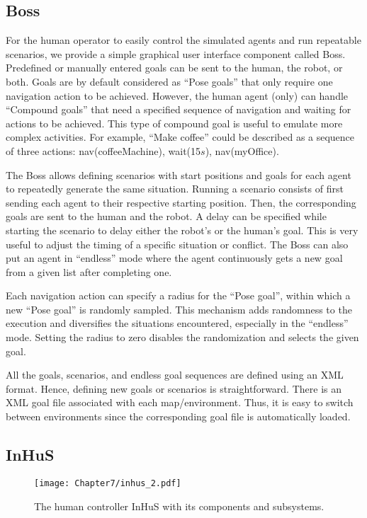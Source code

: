 \subsection{Boss}
For the human operator to easily control the simulated agents and run repeatable scenarios, we provide a simple graphical user interface component called Boss. Predefined or manually entered goals can be sent to the human, the robot, or both. Goals are by default considered as ``Pose goals'' that only require one navigation action to be achieved. However, the human agent (only) can handle ``Compound goals'' that need a specified sequence of navigation and waiting for actions to be achieved. This type of compound goal is useful to emulate more complex activities. For example, ``Make coffee'' could be described as a sequence of three actions: nav(coffeeMachine), wait(15$s$), nav(myOffice).

The Boss allows defining scenarios with start positions and goals for each agent to repeatedly generate the same situation. 
Running a scenario consists of first sending each agent to their respective starting position. Then, the corresponding goals are sent to the human and the robot.
A delay can be specified while starting the scenario to delay either the robot's or the human's goal. This is very useful to adjust the timing of a specific situation or conflict. The Boss can also put an agent in ``endless'' mode where the agent continuously gets a new goal from a given list after completing one. 

Each navigation action can specify a radius for the ``Pose goal'', within which a new ``Pose goal'' is randomly sampled. This mechanism adds randomness to the execution and diversifies the situations encountered, especially in the ``endless'' mode. Setting the radius to zero disables the randomization and selects the given goal.

All the goals, scenarios, and endless goal sequences are defined using an XML format. Hence, defining new goals or scenarios is straightforward. There is an XML goal file associated with each map/environment. Thus, it is easy to switch between environments since the corresponding goal file is automatically loaded.


\subsection{InHuS}

\begin{figure}[b]
    \centering
    \texttt{[image: Chapter7/inhus\_2.pdf]}
    \caption{
    The human controller InHuS with its components and subsystems. 
    }
    \label{fig:inhus_only}
    \vspace{-1cm}
\end{figure}

